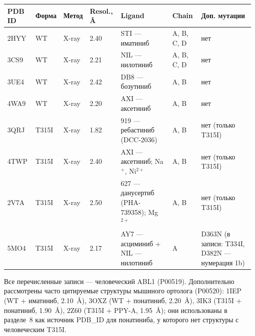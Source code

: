 \documentclass[12pt,a4paper]{article}
\newcommand{\code}[1]{{\ttfamily #1}}
\begin{document}
\begin{center}
\small
\begin{tabular}{L{1.4cm}L{1.3cm}L{2.5cm}L{1.6cm}L{3.3cm}L{1.3cm}L{2.2cm}}
\toprule
\textbf{PDB ID} & \textbf{Форма} & \textbf{Метод} & \textbf{Resol., \AA} & \textbf{Ligand} & \textbf{Chain} & \textbf{Доп. мутации} \\
\midrule
2HYY & WT & X-ray & 2.40 & STI --- иматиниб & A, B, C, D & нет \\
3CS9 & WT & X-ray & 2.21 & NIL --- нилотиниб & A, B, C, D & нет \\
3UE4 & WT & X-ray & 2.42 & DB8 --- бозутиниб & A, B & нет \\
4WA9 & WT & X-ray & 2.20 & AXI --- аксетиниб & A, B & нет \\
\midrule
3QRJ & T315I & X-ray & 1.82 & 919 --- ребастиниб (DCC-2036) & A, B & нет (только T315I) \\
4TWP & T315I & X-ray & 2.40 & AXI --- аксетиниб; Na$^+$, Ni$^{2+}$ & A, B & нет (только T315I) \\
2V7A & T315I & X-ray & 2.50 & 627 --- данусертиб (PHA-739358); Mg$^{2+}$ & A, B & нет (только T315I) \\
5MO4 & T315I & X-ray & 2.17 & AY7 --- асциминиб + NIL --- нилотиниб & A & D363N (в записи: T334I, D382N --- нумерация 1b) \\
\bottomrule
\end{tabular}
\end{center}

\medskip
\noindent Все перечисленные записи --- человеческий ABL1 (\code{P00519}). Дополнительно
рассмотрены часто цитируемые структуры мышиного ортолога (\code{P00520}): \code{1IEP}
(WT + иматиниб, 2.10~\AA), \code{3OXZ} (WT + понатиниб, 2.20~\AA), \code{3IK3}
(T315I + понатиниб, 1.90~\AA), \code{2Z60} (T315I + PPY-A, 1.95~\AA); они использованы
в разделе~8 как источник PDB\_ID для понатиниба, у которого нет структуры с человеческим
T315I.
\end{document}
